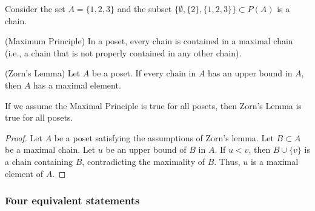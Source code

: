 \begin{example}
  Consider the set $A=\{1,2,3\}$ and the subset $\{\emptyset,\{2\},\{1,2,3\}\}\subset P(A)$ is a chain.
\end{example}

(Maximum Principle) In a poset, every chain is contained in a maximal chain (i.e., a chain that is not properly contained in any other chain).

(Zorn's Lemma) Let $A$ be a poset. If every chain in $A$ has an upper bound in $A$, then $A$ has a maximal element.

\begin{proposition}
  If we assume the Maximal Principle is true for all posets, then Zorn’s Lemma is true for all posets.
\end{proposition}
\begin{proof}
  Let $A$ be a poset satisfying the assumptions of Zorn's lemma. Let $B\subset A$ be a maximal chain. Let $u$ be an upper bound of $B$ in $A$. If $u<v$, then $B\cup\{v\}$ is a chain containing $B$, contradicting the maximality of $B$. Thus, $u$ is a maximal element of $A$.
\end{proof}

\subsubsection{Four equivalent statements}

